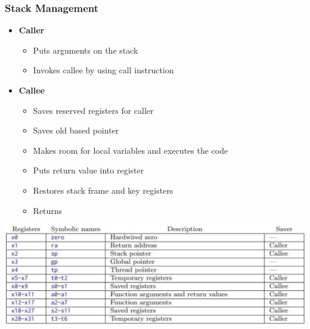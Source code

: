 \documentclass[10pt]{article}
\begin{document}
\subsubsection*{Stack Management}
\begin{itemize}
    \item \textbf{Caller}
    \begin{itemize}
        \item Puts arguments on the stack
        \item Invokes callee by using call instruction
    \end{itemize}
    \item \textbf{Callee}
    \begin{itemize}
        \item Saves reserved registers for caller
        \item Saves old based pointer
        \item Makes room for local variables and executes the code
        \item Puts return value into register
        \item Restores stack frame and key registers
        \item Returns
    \end{itemize}
\end{itemize}
\begin{center}
    \includegraphics*[scale=0.5]{W1_8.png}
\end{center}
\end{document}
